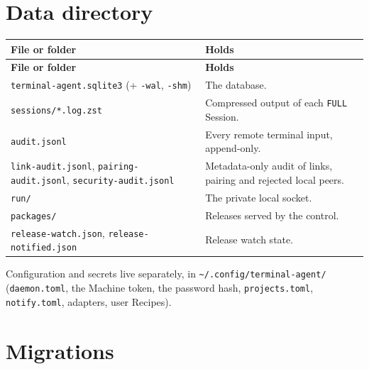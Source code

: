 \section{\texorpdfstring{Data directory}{Data directory}}

\begin{small}
\begin{longtable}{>{\raggedright\arraybackslash}p{0.506\dimexpr \linewidth-4\tabcolsep\relax}>{\raggedright\arraybackslash}p{0.494\dimexpr \linewidth-4\tabcolsep\relax}}
\toprule
\textbf{File or folder} & \textbf{Holds} \\
\midrule
\endfirsthead
\toprule
\textbf{File or folder} & \textbf{Holds} \\
\midrule
\endhead
\texttt{terminal-{}\allowbreak{}agent.\allowbreak{}sqlite3} (+ \texttt{-{}\allowbreak{}wal}, \texttt{-{}\allowbreak{}shm}) & The database. \\
\texttt{sessions/\allowbreak{}*.\allowbreak{}log.\allowbreak{}zst} & Compressed output of each \texttt{FULL} Session. \\
\texttt{audit.\allowbreak{}jsonl} & Every remote terminal input, append-only. \\
\texttt{link-{}\allowbreak{}audit.\allowbreak{}jsonl}, \texttt{pairing-{}\allowbreak{}audit.\allowbreak{}jsonl}, \texttt{security-{}\allowbreak{}audit.\allowbreak{}jsonl} & Metadata-only audit of links, pairing and rejected local peers. \\
\texttt{run/\allowbreak{}} & The private local socket. \\
\texttt{packages/\allowbreak{}} & Releases served by the control. \\
\texttt{release-{}\allowbreak{}watch.\allowbreak{}json}, \texttt{release-{}\allowbreak{}notified.\allowbreak{}json} & Release watch state. \\
\bottomrule
\end{longtable}
\end{small}

Configuration and secrets live separately, in \texttt{\textasciitilde{}/\allowbreak{}.\allowbreak{}config/\allowbreak{}terminal-{}\allowbreak{}agent/\allowbreak{}} (\texttt{daemon.\allowbreak{}toml}, the Machine token, the password hash, \texttt{projects.\allowbreak{}toml}, \texttt{notify.\allowbreak{}toml}, adapters, user Recipes).

\section{\texorpdfstring{Migrations}{Migrations}}

